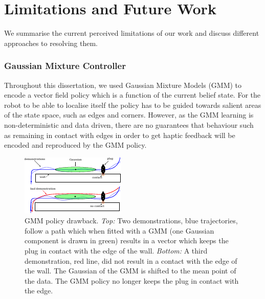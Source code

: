 
\section{Limitations and Future Work}

We summarise the current perceived limitations of our work and discuss different approaches to 
resolving them.

\subsubsection{Gaussian Mixture Controller}
%
%
Throughout this dissertation, we used Gaussian Mixture Models (GMM) to encode a vector 
field policy which is a function of the current belief state. For the robot to be able to localise 
itself the policy has to be guided towards salient areas of the state space, such as edges and corners. 
However, as the GMM learning is non-deterministic and data driven, there are no guarantees that 
behaviour such as remaining in contact with edges in order to get haptic feedback 
will be encoded and reproduced by the GMM policy. 

\begin{figure}[h]
  \centering
  \includegraphics[width=0.9\linewidth]{./ch6-conclusion/Figures/gmm_problem.pdf}
  \caption{GMM policy drawback. \textit{Top:} Two demonstrations, blue trajectories, follow a path
  which when fitted with a GMM (one Gaussian component is drawn in green) results in a vector which keeps the plug 
  in contact with the edge of the wall. \textit{Bottom:} A third demonstration, red line, 
  did not result in a contact with the edge of the wall. The Gaussian of the GMM is shifted to the 
  mean point of the data. The GMM policy no longer keeps the plug in contact with the edge.
  }
  \label{fig:ch6:gmm_traj}
\end{figure}

